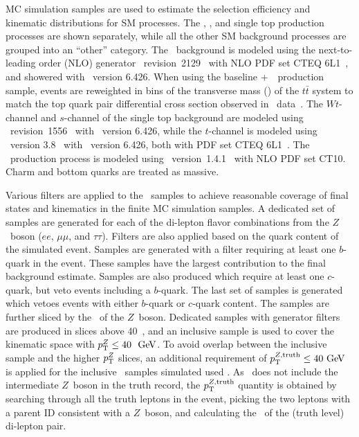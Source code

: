 MC simulation samples are used to estimate the selection efficiency
and kinematic distributions for SM processes.
The \TTBAR, \ZGAMMAJETS, and single top
production processes are shown separately, while all the other SM background
processes are grouped into an ``other'' category.
The \TTBAR\ background is modeled using the next-to-leading order (NLO)
generator \POWHEG\ 
revision~2129~\cite{Nason:2004rx, Frixione:2007vw, Alioli:2010xd,
Frixione:2007nw} with NLO PDF set CTEQ 6L1~\cite{Nadolsky:2008zw}, and 
showered with \PYTHIA\ version 6.426.
When using the baseline \POWHEG+\PYTHIA\ \TTBAR\ production sample,
events are reweighted in bins of the transverse mass (\pt) of the
$t\bar{t}$ system to match the top quark pair differential cross section
observed in \atlas\ data~\cite{Aad:2012hg,Aad:2014zka}.
The $Wt$-channel and $s$-channel of the single top background are modeled using
\POWHEG\ revision~1556~\cite{Alioli:2009je}
with \PYTHIA\ version 6.426, while the $t$-channel is modeled using
\acermc\ version 3.8~\cite{Kersevan:2004yg} with \PYTHIA\ version 6.426,
both with PDF set CTEQ 6L1~\cite{Nadolsky:2008zw}.
The \ZGAMMAJETS\ production process is modeled using
\SHERPA\ version~1.4.1~\cite{Gleisberg:2008ta} with NLO PDF set CT10.
Charm and bottom quarks are treated as massive.

Various filters are applied to the \ZGAMMAJETS\ samples to achieve
reasonable coverage of final states and kinematics in the finite MC simulation
samples.
A dedicated set of samples are generated for each of the di-lepton flavor
combinations from the $Z$~boson ($ee$, $\mu\mu$, and $\tau\tau$).
Filters are also applied based on the quark content of the simulated event.
Samples are generated with a filter requiring at least one $b$-quark in the
event.
These samples have the largest contribution to the final background estimate.
Samples are also produced which require at least one $c$-quark, but veto events
including a $b$-quark.
The last set of samples is generated which vetoes events with either $b$-quark
or $c$-quark content.
The samples are further sliced by the \pt\ of the $Z$~boson.
Dedicated samples with generator filters are produced in slices above 40~\GeV,
and an inclusive sample is used to cover the kinematic space with
$\pt^{Z} \leq 40~\GeV$.
To avoid overlap between the inclusive sample and the higher $p_{\mathrm{T}}^{Z}$ slices,
an additional requirement of $\pt^{Z,\mathrm{truth}} \leq 40 \GeV$ is applied
for the inclusive \ZGAMMAJETS\ samples simulated used \sherpa.
As \sherpa\ does not include the intermediate $Z$~boson in the truth record,
the $p_{\mathrm{T}}^{Z,\mathrm{truth}}$ quantity is obtained by searching through all the
truth leptons in the event, picking the two leptons with a parent ID
consistent with a $Z$~boson, and calculating the \pt\ of the (truth level) 
di-lepton pair.

